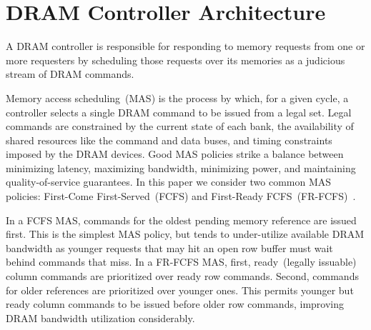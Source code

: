 \section{DRAM Controller Architecture}\label{sec:dram-mas}
A DRAM controller is responsible for responding to memory
requests from one or more requesters by scheduling those requests over its
memories as a judicious stream of DRAM commands.

Memory access scheduling~(MAS) is the process by which, for a given cycle, a
controller selects a single DRAM command to be issued from a legal set. Legal
commands are constrained by the current state of each bank, the availability of
shared resources like the command and data buses, and timing constraints
imposed by the DRAM devices. Good MAS policies strike a balance
between minimizing latency, maximizing bandwidth, minimizing power, and
maintaining quality-of-service guarantees. In this paper we consider two common
MAS policies: First-Come First-Served~(FCFS) and First-Ready
FCFS~(FR-FCFS)~\cite{frfcfs}.

In a FCFS MAS, commands for the oldest pending memory reference are issued
first. This is the simplest MAS policy, but tends to under-utilize available
DRAM bandwidth as younger requests that may hit an open row buffer must wait
behind commands that miss. In a FR-FCFS MAS, first, ready~(legally issuable) column
commands are prioritized over ready row commands. Second, commands for older
references are prioritized over younger ones. This permits younger but ready
column commands to be issued before older row commands, improving DRAM bandwidth
utilization considerably.

